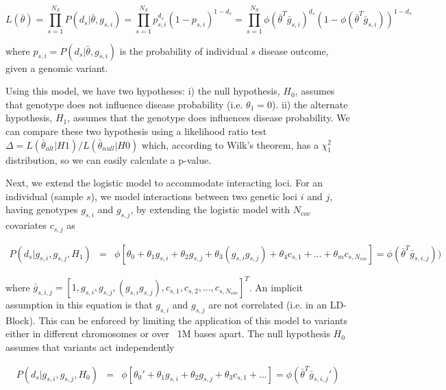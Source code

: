 \[
L( \bar{\theta} ) = \prod_{s=1}^{N_S}{ P( d_s | \bar{\theta}, g_{s,i} ) } = \prod_{s=1}^{N_S}{ p_{s,i}^{d_s} (1-p_{s,i})^{1-d_s} } = \prod_{s=1}^{N_S}{ \phi( \bar{\theta}^T \bar{g}_{s,i})^{d_s} (1-\phi( \bar{\theta}^T \bar{g}_{s,i}))^{1-d_s} }
\]

where $p_{s,i} = P( d_s | \bar{\theta}, g_{s,i} )$ is the probability of individual $s$ disease outcome, given a genomic variant.

Using this model, we have two hypotheses: i) the null hypothesis, $H_0$, assumes that genotype does not influence disease probability (i.e. $\theta_1 = 0$). ii) the alternate hypothesis, $H_1$, assumes that the genotype does influences disease probability. We can compare these two hypothesis using a likelihood ratio test $\Delta = L( \bar{\theta}_{alt} | H1 ) / L( \bar{\theta}_{null} | H0 ) $ which, according to Wilk's theorem, has a $\chi^2_1$ distribution, so we can easily calculate a p-value.

Next, we extend the logistic model to accommodate interacting loci. For an individual (sample $s$), we model interactions between two genetic loci $i$ and $j$, having genotypes $g_{s,i}$ and $g_{s,j}$, by extending the logistic model with $N_{cov}$ covariates $c_{s,j}$ as

\begin{eqnarray*}
P( d_s | g_{s,i},g_{s,j}, H_1) & = & \phi[ \theta_0 + \theta_1 g_{s,i} + \theta_2 g_{s,j} + \theta_3 (g_{s,i} g_{s,j}) + \theta_4 c_{s,1} + ... + \theta_m c_{s,N_{cov}} ] 
= \phi( \bar{\theta}^T \bar{g}_{s,i,j}) )
\end{eqnarray*}

where $\bar{g}_{s,i,j} =  [1, g_{s,i}, g_{s,j}, ( g_{s,i} g_{s,j}), c_{s,1}, c_{s,2}, ..., c_{s,N_{cov}} ]^T$. An implicit assumption in this equation is that $g_{s,i}$ and $g_{s,j}$ are not correlated (i.e. in an LD-Block). This can be enforced by limiting the application of this model to variants either in different chromosomes or over ~1M bases apart. The null hypothesis $H_0$ assumes that variants act independently

\begin{eqnarray*}
P( d_s | g_{s,i},g_{s,j}, H_0) & = & 
\phi[ \theta_0' + \theta_1 g_{s,i} + \theta_2 g_{s,j} + \theta_3 c_{s,1} + ... ] 
= \phi( \bar{\theta}^T \bar{g}_{s,i,j}' )
\end{eqnarray*}

